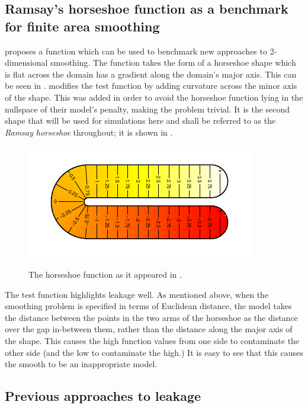 \subsection{Ramsay's horseshoe function as a benchmark for finite area smoothing}

\label{ramsayfunc}

\cite{ramsay} proposes a function which can be used to benchmark new approaches to 2-dimensional smoothing. The function takes the form of a horseshoe shape which is flat across the domain has a gradient along the domain's major axis. This can be seen in . \cite{soap} modifies the test function by adding curvature across the minor axis of the shape. This was added in order to avoid the horseshoe function lying in the nullspace of their model's penalty, making the problem trivial. It is the second shape that will be used for simulations here and shall be referred to as the \emph{Ramsay horseshoe} throughout; it is shown in .

\begin{figure}
\centering
\includegraphics{intro/figs/orig-fs.pdf}\\
\caption{The horseshoe function as it appeared in \cite{ramsay}.}
\label{orig-fs}
\end{figure}

The test function highlights leakage well. As mentioned above, when the smoothing problem is specified in terms of Euclidean distance, the model takes the distance between the points in the two arms of the horseshoe as the distance over the gap in-between them, rather than the distance along the major axis of the shape. This causes the high function values from one side to contaminate the other side (and the low to contaminate the high.) It is easy to see that this causes the smooth to be an inappropriate model.
		
\subsection{Previous approaches to leakage}
\label{intro-leakageapproaches}


